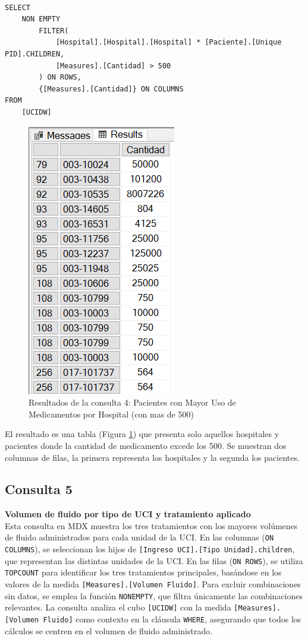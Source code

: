 \documentclass{article}
\begin{document}
\begin{lstlisting}[style=ddlstyle, label=lst:consulta4,caption=Consulta 4: Pacientes con Mayor Uso de Medicamentos por Hospital (con mas de 500)]
	
SELECT 
	NON EMPTY 
		FILTER(
			[Hospital].[Hospital].[Hospital] * [Paciente].[Unique PID].CHILDREN,
			[Measures].[Cantidad] > 500
		) ON ROWS, 
		{[Measures].[Cantidad]} ON COLUMNS
FROM 
	[UCIDW]
\end{lstlisting}

\begin{figure}[H]
	\centering
	\includegraphics[width=0.3\linewidth]{images/consulta4.png}
	\caption{Resultados de la consulta 4: Pacientes con Mayor Uso de Medicamentos por Hospital (con mas de 500)}
	\label{fig:consulta4}
\end{figure}

El resultado es una tabla (Figura \ref{fig:consulta4}) que presenta solo aquellos hospitales y pacientes donde la cantidad de medicamento excede los 500. Se muestran dos columnas de filas, la primera representa los hospitales y la segunda los pacientes.

\subsection{Consulta 5}

\textbf{Volumen de fluido por tipo de UCI y tratamiento aplicado}
\\

Esta consulta en MDX muestra los tres tratamientos con los mayores volúmenes de fluido administrados para cada unidad de la UCI. En las columnas (\texttt{ON COLUMNS}), se seleccionan los hijos de \texttt{[Ingreso UCI].[Tipo Unidad].children}, que representan las distintas unidades de la UCI. En las filas (\texttt{ON ROWS}), se utiliza \texttt{TOPCOUNT} para identificar los tres tratamientos principales, basándose en los valores de la medida \texttt{[Measures].[Volumen Fluido]}. Para excluir combinaciones sin datos, se emplea la función \texttt{NONEMPTY}, que filtra únicamente las combinaciones relevantes. La consulta analiza el cubo \texttt{[UCIDW]} con la medida \texttt{[Measures].[Volumen Fluido]} como contexto en la cláusula \texttt{WHERE}, asegurando que todos los cálculos se centren en el volumen de fluido administrado.
\\ 
\end{document}
